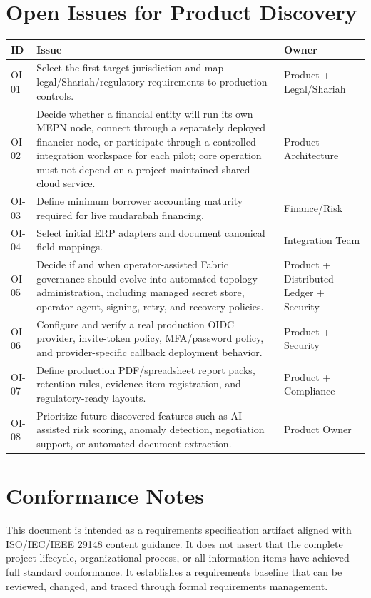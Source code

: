 \documentclass[11pt,a4paper]{article}
\begin{document}
\section{Open Issues for Product Discovery}
\begin{longtable}{@{}p{}p{}p{}@{}}
\rowcolor{gray!18}\textbf{ID} & \textbf{Issue} & \textbf{Owner} \\ \hline
OI-01 & Select the first target jurisdiction and map legal/Shariah/regulatory requirements to production controls. & Product + Legal/Shariah \\ \hline
OI-02 & Decide whether a financial entity will run its own MEPN node, connect through a separately deployed financier node, or participate through a controlled integration workspace for each pilot; core operation must not depend on a project-maintained shared cloud service. & Product Architecture \\ \hline
OI-03 & Define minimum borrower accounting maturity required for live mudarabah financing. & Finance/Risk \\ \hline
OI-04 & Select initial ERP adapters and document canonical field mappings. & Integration Team \\ \hline
OI-05 & Decide if and when operator-assisted Fabric governance should evolve into automated topology administration, including managed secret store, operator-agent, signing, retry, and recovery policies. & Product + Distributed Ledger + Security \\ \hline
OI-06 & Configure and verify a real production OIDC provider, invite-token policy, MFA/password policy, and provider-specific callback deployment behavior. & Product + Security \\ \hline
OI-07 & Define production PDF/spreadsheet report packs, retention rules, evidence-item registration, and regulatory-ready layouts. & Product + Compliance \\ \hline
OI-08 & Prioritize future discovered features such as AI-assisted risk scoring, anomaly detection, negotiation support, or automated document extraction. & Product Owner \\ \hline
\end{longtable}

\section{Conformance Notes}
This document is intended as a requirements specification artifact aligned with ISO/IEC/IEEE 29148 content guidance. It does not assert that the complete project lifecycle, organizational process, or all information items have achieved full standard conformance. It establishes a requirements baseline that can be reviewed, changed, and traced through formal requirements management.
\end{document}
